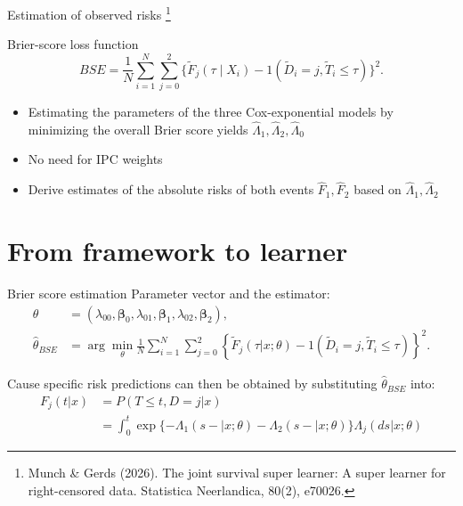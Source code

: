\documentclass{beamer}\usepackage{listings}
\begin{document}
\begin{frame}[label={sec:org84e2fd3}]{Estimation of observed risks \footnote{Munch \& Gerds (2026). The joint survival super learner: A super learner for right-censored data. Statistica Neerlandica, 80(2), e70026.}}
\begin{block}{Brier-score loss function}
\[
BSE=
\frac{1}{N}\sum_{i=1}^{N}\sum_{j=0}^{2}
\{\widetilde{F}_j(\tau\mid X_i)-1(\widetilde{D}_i= j,\widetilde{T}_i\leq \tau)\}^{2}.
\]
\end{block}
\pause

\begin{itemize}
\item Estimating the parameters of the three Cox-exponential models by minimizing the overall Brier score yields \(\hat\Lambda_1,\hat\Lambda_2, \hat\Lambda_0\)
\end{itemize}

\begin{itemize}
\item No need for IPC weights
\item Derive estimates of the absolute risks of both events \(\hat F_1, \hat F_2\) based on \(\hat\Lambda_1,\hat\Lambda_2\)
\end{itemize}
\end{frame}

\section{From framework to learner}
\label{sec:org7f3a146}

\begin{frame}[label={sec:orgd1735ed}]{Brier score estimation}
Parameter vector and the estimator:
\begin{align*}
{\theta} &= (\lambda_{00},\boldsymbol{\beta}_0,\lambda_{01},\boldsymbol{\beta}_1,\lambda_{02},\boldsymbol{\beta}_2), \\
\hat{\theta}_{BSE}&=\arg\min_{\theta}\frac{1}{N}\sum_{i=1}^{N}\sum_{j=0}^{2}
\left\{\widetilde F_j(\tau|x;\theta)-1(\widetilde{D}_i= j,\widetilde{T}_i\leq \tau)\right\}^{2}.
\end{align*}

\pause \vfill
Cause specific risk predictions can then be obtained by substituting \(\hat \theta_{BSE}\) into:
\begin{align*}
F_j(t|x) &= P(T\leq t, D = j|x)\\
&= \int_0^t \exp\{-\Lambda_1(s-|x;\theta)-\Lambda_2(s-|x;\theta)\} \Lambda_j(ds|x;\theta)
\end{align*}
\end{frame}
\end{document}
